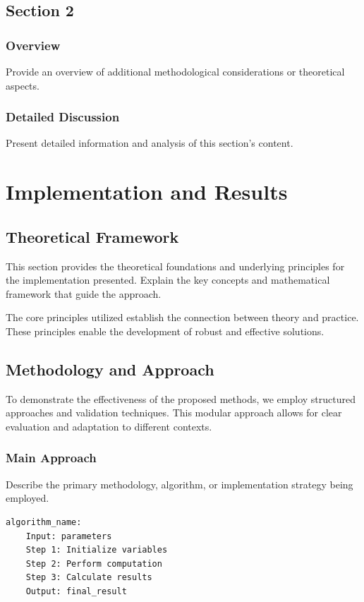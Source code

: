 \subsection{Section 2}
\subsubsection{Overview}
Provide an overview of additional methodological considerations or theoretical aspects.

\subsubsection{Detailed Discussion}
Present detailed information and analysis of this section's content.

\section{Implementation and Results}

\subsection{Theoretical Framework}
This section provides the theoretical foundations and underlying principles for the implementation presented. Explain the key concepts and mathematical framework that guide the approach.

The core principles utilized establish the connection between theory and practice. These principles enable the development of robust and effective solutions.

\subsection{Methodology and Approach}

To demonstrate the effectiveness of the proposed methods, we employ structured approaches and validation techniques. This modular approach allows for clear evaluation and adaptation to different contexts.

\subsubsection{Main Approach}
Describe the primary methodology, algorithm, or implementation strategy being employed.

\begin{lstlisting}[caption={Pseudocode for the Main Approach}, label={lst:algo}]
algorithm_name:
    Input: parameters
    Step 1: Initialize variables
    Step 2: Perform computation
    Step 3: Calculate results
    Output: final_result
\end{lstlisting}

